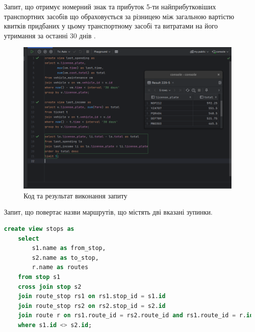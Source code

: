\documentclass[14pt]{extreport}
\begin{document}
\begin{normalsize}
	Запит, що отримує номерний знак та прибуток 5-ти найприбутковіших транспортних засобів що обраховується за різницею між загальною вартістю квитків придбаних у цьому транспортному засобі та витратами на його утримання за останні 30 днів .
	

	\begin{figure}[H]
		\centering
		\includegraphics[scale=0.5]{2}
		\caption{Код та результат виконання запиту}
	\end{figure}
	\pagebreak
	Запит, що повертає назви маршрутів, що містять дві вказані зупинки.
	
	\iffalse
	\begin{lstlisting}[language=sql]
	create view stops as
	select
		s1.name as from_stop,
		s2.name as to_stop,
		r.name as routes
	from stop s1
	cross join stop s2
	join route_stop rs1 on rs1.stop_id = s1.id
	join route_stop rs2 on rs2.stop_id = s2.id
	join route r on rs1.route_id = rs2.route_id and rs1.route_id = r.id
	where s1.id <> s2.id;
	

\end{lstlisting}
\end{normalsize}
\end{document}
